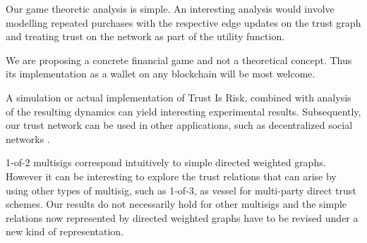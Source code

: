   Our game theoretic analysis is simple. An interesting analysis would involve modelling repeated purchases with the
  respective edge updates on the trust graph and treating trust on the network as part of the utility function.

  We are proposing a concrete financial game and not a theoretical concept. Thus its implementation as a wallet on any
  blockchain will be most welcome.

  A simulation or actual implementation of Trust Is Risk, combined with analysis of the resulting dynamics can yield
  interesting experimental results. Subsequently, our trust network can be used in other applications, such as decentralized
  social networks \cite{synereo}.

  1-of-2 multisigs correspond intuitively to simple directed weighted graphs. However it can be interesting to explore
  the trust relations that can arise by using other types of multisig, such as 1-of-3, as vessel for multi-party direct trust
  schemes. Our results do not necessarily hold for other multisigs and the simple relations now represented by directed
  weighted graphs have to be revised under a new kind of representation.
